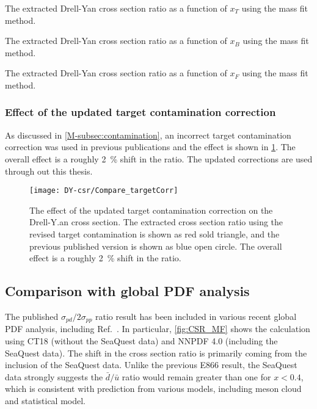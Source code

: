 \documentclass[../main.tex]{subfiles}
\begin{document}
\begin{table}[h!]
	\centering
	\caption{The extracted Drell-Yan cross section ratio as a function of $x_T$ using the mass fit method.}
	\label{tab:DY-MF-x2}
	
\end{table}
\begin{table}[h!]
	\centering
	\caption{The extracted Drell-Yan cross section ratio as a function of $x_B$ using the mass fit method.}
	\label{tab:DY-MF-x1}
	
\end{table}
\begin{table}[h!]
	\centering
	\caption{The extracted Drell-Yan cross section ratio as a function of $x_F$ using the mass fit method.}
	\label{tab:DY-MF-xF}
	
\end{table}
\FloatBarrier

\subsubsection{Effect of the updated target contamination correction}
\label{subsec:contamination_result}
As discussed in \cref{M-subsec:contamination}, an incorrect target contamination correction was used
in previous publications and the effect is shown in \cref{fig:contaimination_CSR}.
The overall effect is a roughly \SI{2}{\percent} shift in the ratio. The updated corrections
are used through out this thesis.
\begin{figure}[h!]
	\centering
	\texttt{[image: DY-csr/Compare\_targetCorr]}
	\caption{The effect of the updated target contamination correction on the Drell-Y.an
		cross section. The extracted cross section ratio using the revised target contamination
		is shown as red sold triangle, and the previous published version is shown as blue open
		circle. The overall effect is a roughly \SI{2}{\percent} shift in the ratio. }
	\label{fig:contaimination_CSR}
\end{figure}


\subsection{Comparison with global PDF analysis}
The published $\sigma_{pd}/2\sigma_{pp}$ ratio result has been included in various recent global
PDF analysis, including Ref.~\cite{cocuzza2021,guzzi2022,accardi2023,alekhin2023}.
In particular, \cref{fig:CSR_MF} shows the calculation using CT18 (without the SeaQuest data)
and NNPDF 4.0 (including the SeaQuest data). The shift in the cross section ratio is primarily
coming from the inclusion of the SeaQuest data. Unlike the previous E866 result, the SeaQuest data
strongly suggests the $\bar{d}/\bar{u}$ ratio would remain greater than one for $x<0.4$, which is
consistent with prediction from various models, including meson cloud and statistical model.
\end{document}
